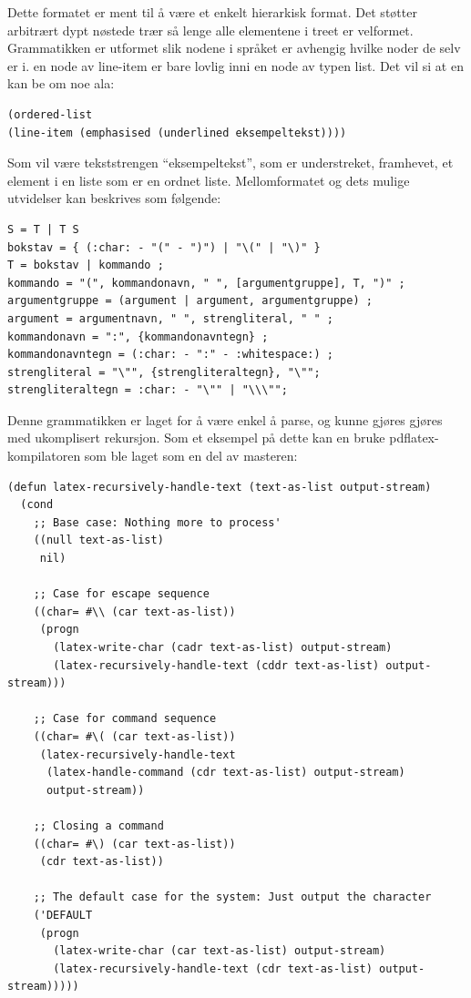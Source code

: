 \documentclass[norsk, 11pt, a4paper]{article}
\begin{document}
Dette formatet er ment til å være et enkelt hierarkisk format. Det støtter arbitrært dypt nøstede trær så lenge alle elementene i treet er velformet.
Grammatikken er utformet slik nodene i språket er avhengig hvilke noder de selv er i. en node av line-item er bare lovlig inni en node av typen list.
Det vil si at en kan be om noe ala:
\begin{lstlisting}
(ordered-list 
(line-item (emphasised (underlined eksempeltekst))))
\end{lstlisting}
Som vil være tekststrengen ``eksempeltekst'', som er understreket, framhevet, et element i en liste som er en ordnet liste.
Mellomformatet og dets mulige utvidelser kan beskrives som følgende:

\begin{lstlisting}
S = T | T S
bokstav = { (:char: - "(" - ")") | "\(" | "\)" }
T = bokstav | kommando ;
kommando = "(", kommandonavn, " ", [argumentgruppe], T, ")" ;
argumentgruppe = (argument | argument, argumentgruppe) ;
argument = argumentnavn, " ", strengliteral, " " ;
kommandonavn = ":", {kommandonavntegn} ;
kommandonavntegn = (:char: - ":" - :whitespace:) ;
strengliteral = "\"", {strengliteraltegn}, "\"";
strengliteraltegn = :char: - "\"" | "\\\"";
\end{lstlisting}

Denne grammatikken er laget for å være enkel å parse, og kunne gjøres gjøres med ukomplisert rekursjon.
Som et eksempel på dette kan en bruke pdflatex-kompilatoren som ble laget som en del av masteren:

\lstset{language=Lisp}
\begin{lstlisting}
(defun latex-recursively-handle-text (text-as-list output-stream)
  (cond
    ;; Base case: Nothing more to process'
    ((null text-as-list)
     nil)

    ;; Case for escape sequence
    ((char= #\\ (car text-as-list))
     (progn
       (latex-write-char (cadr text-as-list) output-stream)
       (latex-recursively-handle-text (cddr text-as-list) output-stream)))

    ;; Case for command sequence
    ((char= #\( (car text-as-list))
     (latex-recursively-handle-text
      (latex-handle-command (cdr text-as-list) output-stream)
      output-stream))

    ;; Closing a command
    ((char= #\) (car text-as-list))
     (cdr text-as-list))
  
    ;; The default case for the system: Just output the character
    ('DEFAULT
     (progn
       (latex-write-char (car text-as-list) output-stream)
       (latex-recursively-handle-text (cdr text-as-list) output-stream)))))
\end{lstlisting}
\end{document}
